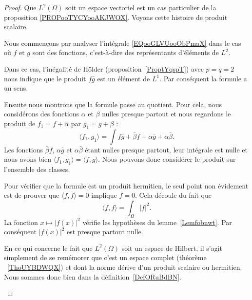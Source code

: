 \begin{proof}
	Que \( L^2(\Omega)\) soit un espace vectoriel est un cas particulier de la proposition \ref{PROPooTYCYooAKJWOX}. Voyons cette histoire de produit scalaire.

	\begin{subproof}
		Nous commençons par analyser l'intégrale \eqref{EQooGLVUooObPmaX} dans le cas où \( f\) et \( g\) sont des fonctions, c'est-à-dire des représentants d'éléments de \( L^2\).

		Dans ce cas, l'inégalité de Hölder (proposition~\ref{ProptYqspT}) avec \( p=q=2\) nous indique que le produit \( f\bar g\) est un élément de \( L^1\). Par conséquent la formule a un sens.


		Ensuite nous montrons que la formule passe au quotient. Pour cela, nous considérons des fonctions \( \alpha\) et \( \beta\) nulles presque partout et nous regardons le produit de \( f_1=f+\alpha\) par \( g_1=g+\beta\) :
		\begin{equation}
			\langle f_1, g_1\rangle =\int f\bar g+\bar\beta f+\alpha \bar g+ \alpha\bar\beta.
		\end{equation}
		Les fonctions \( \bar\beta f\), \( \alpha \bar g\) et \( \alpha\bar\beta\) étant nulles presque partout, leur intégrale est nulle et nous avons bien \( \langle f_1, g_1\rangle =\langle f,g \rangle \). Nous pouvons donc considérer le produit sur l'ensemble des classes.

		Pour vérifier que la formule est un produit hermitien, le seul point non évidement est de prouver que \( \langle f, f\rangle =0\) implique \( f=0\). Cela découle du fait que
		\begin{equation}
			\langle f, f\rangle =\int_{\Omega}| f |^2.
		\end{equation}
		La fonction \( x\mapsto | f(x) |^2\) vérifie les hypothèses du lemme~\ref{Lemfobnwt}. Par conséquent \( | f(x) |^2\) est presque partout nulle.

		En ce qui concerne le fait que \( L^2(\Omega)\) soit un espace de Hilbert, il s'agit simplement de se remémorer que c'est un espace complet (théorème ~\ref{ThoUYBDWQX}) et dont la norme dérive d'un produit scalaire ou hermitien. Nous sommes donc bien dans la définition~\ref{DefORuBdBN}.
	\end{subproof}
\end{proof}

